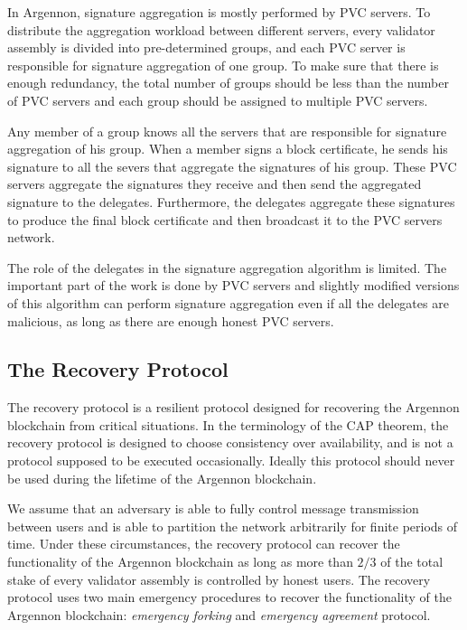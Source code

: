 In Argennon, signature aggregation is mostly performed by PVC servers. To distribute the aggregation workload
between different servers, every validator assembly is divided into pre-determined groups, and each PVC
server is responsible for signature aggregation of one group. To make sure that there is enough redundancy, the
total number of groups should be less than the number of PVC servers and each group should be assigned to
multiple PVC servers.

Any member of a group knows all the servers that are responsible for signature aggregation of his group. When a member
signs a block certificate, he sends his signature to all the severs that aggregate the signatures of his group.
These PVC servers aggregate the signatures they receive and then send the aggregated signature to the delegates.
Furthermore, the delegates aggregate these signatures to produce the final block certificate
and then broadcast it to the PVC servers network.

The role of the delegates in the signature aggregation algorithm is limited. The important part of the work is done by
PVC servers and slightly modified versions of this algorithm can perform signature aggregation
even if all the delegates are malicious, as long as there are enough honest PVC servers.

\subsection{The Recovery Protocol}\label{subsec:recovery}

The recovery protocol is a resilient protocol designed for recovering the Argennon blockchain from critical situations.
In the terminology of the CAP theorem, the recovery protocol is designed to choose consistency over availability,
and is not a protocol supposed to be executed occasionally. Ideally this protocol should never be used
during the lifetime of the Argennon blockchain.

We assume that an adversary is able to fully control message transmission between users and is able to partition the
network arbitrarily for finite periods of time. Under these circumstances, the recovery protocol can recover the
functionality of the Argennon blockchain as long as more than $2/3$ of the total stake of every validator assembly is
controlled by honest users. The recovery protocol uses two main emergency procedures to
recover the functionality of the Argennon blockchain: \emph{emergency forking} and \emph{emergency
agreement} protocol.

